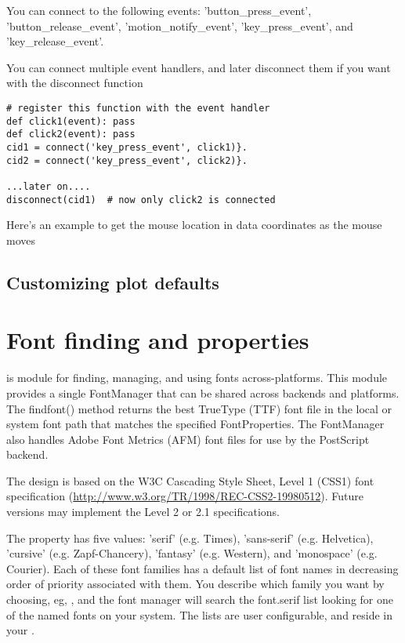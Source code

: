 \documentclass[twoside]{book}
\begin{document}
\noindent You can connect to the following events: 'button\_press\_event',
'button\_release\_event', 'motion\_notify\_event',
'key\_press\_event', and 'key\_release\_event'.

You can connect multiple event handlers, and later disconnect them if
you want with the disconnect function

\begin{lstlisting}
# register this function with the event handler
def click1(event): pass 
def click2(event): pass 
cid1 = connect('key_press_event', click1)}.  
cid2 = connect('key_press_event', click2)}.  

...later on....
disconnect(cid1)  # now only click2 is connected
\end{lstlisting}

Here's an example to get the mouse location in data coordinates as the
mouse moves



\section{Customizing plot defaults}
\label{sec:rc_command}



\chapter{Font finding and properties}
\label{cha:font_finding}

 is module for finding,
managing, and using fonts across-platforms.  This module provides a
single FontManager that can be shared across backends and platforms.
The findfont() method returns the best TrueType (TTF) font file in the
local or system font path that matches the specified FontProperties.
The FontManager also handles Adobe Font Metrics (AFM) font files for
use by the PostScript backend.

The design is based on the W3C Cascading Style Sheet, Level 1 (CSS1)
font specification (\url{http://www.w3.org/TR/1998/REC-CSS2-19980512}).
Future versions may implement the Level 2 or 2.1 specifications.
      
The  property has five values: 'serif' (e.g. Times),
'sans-serif' (e.g. Helvetica), 'cursive' (e.g. Zapf-Chancery),
'fantasy' (e.g. Western), and 'monospace' (e.g. Courier).  Each of
these font families has a default list of font names in decreasing
order of priority associated with them.  You describe which family you
want by choosing, eg, , and the font manager will
search the font.serif list looking for one of the named fonts on your
system.  The lists are user configurable, and reside in your
.
\end{document}
